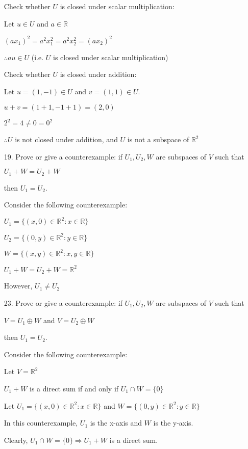 \documentclass{article}
\begin{document}
\begin{enumerate}[nolistsep]
		Check whether $U$ is closed under scalar multiplication:
		
		Let $u \in U$ and $a \in \mathbb{R}$
		
		$(ax_1)^2 = a^2x_1^2 = a^2x_2^2 = (ax_2)^2$
		
		$\therefore au \in U$ (i.e. $U$ is closed under scalar multiplication)
		
		Check whether $U$ is closed under addition:
		
		Let $u = (1, -1) \in U$ and $v = (1, 1) \in U$.
		
		$u + v = (1 + 1, -1 + 1) = (2, 0)$
		
		$2^2 = 4 \neq 0 = 0^2$
		
		$\therefore U$ is not closed under addition, and $U$ is not a subspace of $\mathbb{R}^2$
		
		\item[19.] Prove or give a counterexample: if $U_1, U_2, W$ are subspaces of $V$ such that
		
\centerline{$U_1 + W = U_2 + W$}

then $U_1 = U_2$. 
		
		Consider the following counterexample:
		
		$U_1 = \{(x, 0) \in \mathbb{R}^2 : x \in \mathbb{R}\}$
		
		$U_2 = \{(0, y) \in \mathbb{R}^2 : y \in \mathbb{R}\}$
		
		$W = \{(x, y) \in \mathbb{R}^2 : x, y \in \mathbb{R}\}$
		
		$U_1 + W = U_2 + W = \mathbb{R}^2$
		
		However, $U_1 \neq U_2$
		
		\item[23.] Prove or give a counterexample: if $U_1, U_2, W$ are subspaces of $V$ such that
		
		\centerline{$V = U_1 \oplus W$ and $V = U_2 \oplus W$}
		
		then $U_1 = U_2$.
		
		Consider the following counterexample:
		
		Let $V = \mathbb{R}^2$
		
		$U_1 + W$ is a direct sum if and only if $U_1 \cap W = \{0\}$
		
		Let $U_1 = \{(x,0) \in \mathbb{R}^2 : x \in \mathbb{R}\}$ and $W = \{(0,y) \in \mathbb{R}^2 : y \in \mathbb{R}\}$		
		
		In this counterexample, $U_1$ is the x-axis and $W$ is the y-axis.
		
		Clearly, $U_1 \cap W = \{0\} \Rightarrow U_1 + W$ is a direct sum.
		

\end{enumerate}
\end{document}
